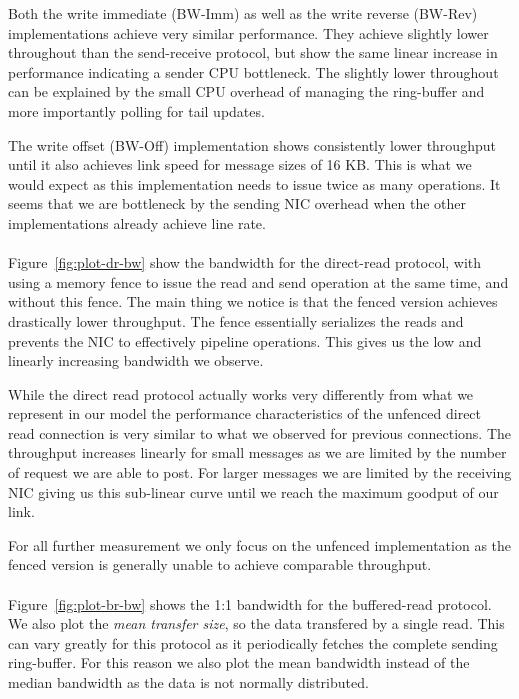 Both the write immediate (BW-Imm) as well
as the write reverse (BW-Rev) implementations achieve very similar performance. They achieve slightly lower throughout
than the send-receive protocol, but show the same linear increase in performance indicating a sender CPU bottleneck. The
slightly lower throughout can be explained by the small CPU overhead of managing the ring-buffer and more importantly  
polling for tail updates.

The write offset (BW-Off) implementation shows consistently lower throughput until it also achieves
link speed for message sizes of 16 KB. This is what we would expect as this implementation needs to issue 
twice as many operations. It seems that we are bottleneck by the sending NIC overhead when the other
implementations already achieve line rate.

\paragraph{} Figure~\ref{fig:plot-dr-bw} show the bandwidth for the direct-read protocol, with using a memory fence
to issue the read and send operation at the same time, and without this fence.  The main thing we notice is that the 
fenced version achieves drastically lower throughput. The fence essentially serializes the reads and prevents the NIC 
to effectively pipeline operations. This gives us the low and linearly increasing bandwidth we observe.

While the direct read protocol actually works very differently from what we represent in our model the performance 
characteristics of the unfenced direct read connection is very similar to what we observed for previous connections. The
throughput increases linearly for small messages as we are limited by the number of request we are able to post. For larger
messages we are limited by the receiving NIC giving us this sub-linear curve until we reach the maximum goodput of our link.

For all further measurement we only focus on the unfenced implementation as the fenced version is generally unable
to achieve comparable throughput.


\paragraph{} Figure~\ref{fig:plot-br-bw} shows the 1:1 bandwidth for the buffered-read protocol. We also plot the 
\emph{mean transfer size}, so the data transfered by a single read. This can vary greatly for this protocol as it periodically
fetches the complete sending ring-buffer. For this reason we also plot the mean bandwidth instead of the median bandwidth 
as the data is not normally distributed.

